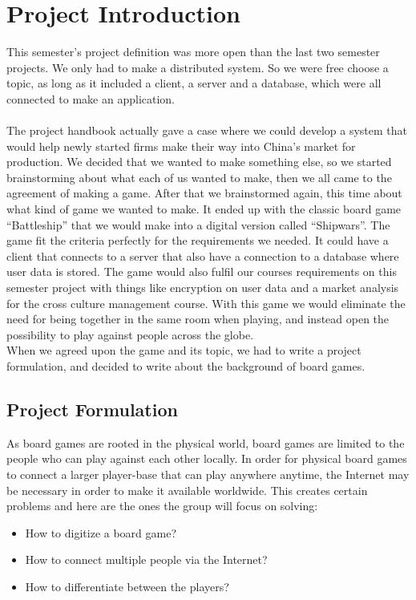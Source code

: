 
\chapter{Project Introduction}

	This semester’s project definition was more open than the last
	 two semester projects. We only had to make a distributed system.
	  So we were free choose a topic, as long as it included a client,
		 a server and a database, which were all connected to make an application.
	\\
	\\
	The project handbook actually gave a case where we could develop
	 a system that would help newly started firms make their way into
	  China’s market for production. We decided that we wanted to
		make something else, so we started brainstorming about what
		 each of us wanted to make, then we all came to the agreement
		  of making a game. After that we brainstormed again, this time
			 about what kind of game we wanted to make. It ended up with
			  the classic board game “Battleship” that we would make into
				 a digital version called “Shipwars”. The game fit the criteria
				 perfectly for the requirements we needed. It could have a client
				 that connects to a server that also have a connection to a database
				  where user data is stored. The game would also fulfil our courses
					requirements on this semester project with things like encryption on
					 user data and a market analysis for the cross culture
					  management course. With this game we would eliminate
						the need for being together in the same room when playing, and
						 instead open the possibility to play against people across
						 the globe.
	\\
When we agreed upon the game and its topic, we had to write a project
formulation, and decided to write about the background of board games.
	\\
	\section{Project Formulation}

	As board games are rooted in the physical world, board games are limited
	 to the people who can play against each other locally. In order for
	 physical board games to connect a larger player-base that can play anywhere
	  anytime, the Internet may be necessary in order to make it available
		 worldwide. This creates certain problems and here are the ones the
		  group will focus on solving:
	\begin{itemize}
		\item How to digitize a board game?
		\item How to connect multiple people via the Internet?
		\item How to differentiate between the players?
	\end{itemize}
